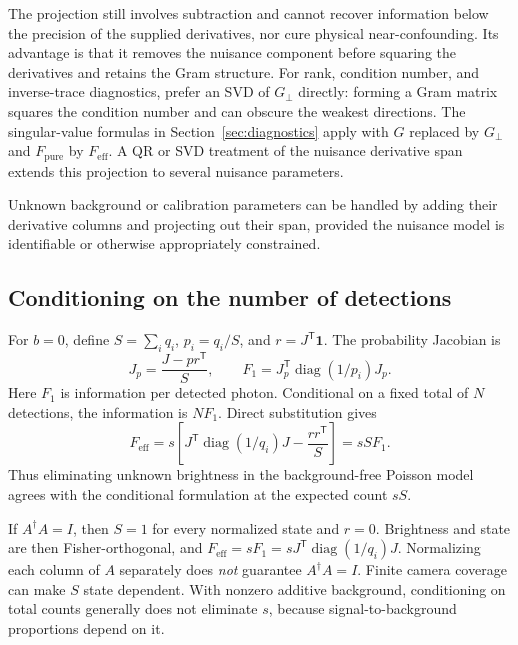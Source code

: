\documentclass[11pt,a4paper]{article}
\newcommand{\diag}{\operatorname{diag}}
\begin{document}
The projection still involves subtraction and cannot recover information
below the precision of the supplied derivatives, nor cure physical
near-confounding. Its advantage is that it removes the nuisance component
before squaring the derivatives and retains the Gram structure. For rank,
condition number, and inverse-trace diagnostics, prefer an SVD of
$G_\perp$ directly: forming a Gram matrix squares the condition number and
can obscure the weakest directions. The singular-value formulas in
Section~\ref{sec:diagnostics} apply with $G$ replaced by $G_\perp$ and
$F_{\mathrm{pure}}$ by $F_{\mathrm{eff}}$. A QR or SVD treatment of the
nuisance derivative span extends this
projection to several nuisance parameters.

Unknown background or calibration parameters can be handled by adding
their derivative columns and projecting out their span, provided the
nuisance model is identifiable or otherwise appropriately constrained.

\subsection{Conditioning on the number of detections}
For $b=0$, define $S=\sum_iq_i$, $p_i=q_i/S$, and
$r=J^{\mathsf T}\mathbf 1$. The probability Jacobian is
\begin{equation}
 J_p=\frac{J-pr^{\mathsf T}}{S},\qquad
 F_1=J_p^{\mathsf T}\diag(1/p_i)J_p. \label{eq:conditional}
\end{equation}
Here $F_1$ is information per detected photon. Conditional on a fixed total
of $N$ detections, the information is $NF_1$. Direct substitution gives
\begin{equation}
 F_{\mathrm{eff}}=s\left[J^{\mathsf T}\diag(1/q_i)J
 -\frac{rr^{\mathsf T}}{S}\right]=sS F_1.
\end{equation}
Thus eliminating unknown brightness in the background-free Poisson model
agrees with the conditional formulation at the expected count $sS$.

If $A^\dagger A=I$, then $S=1$ for every normalized state and $r=0$.
Brightness and state are then Fisher-orthogonal, and
$F_{\mathrm{eff}}=sF_1=sJ^{\mathsf T}\diag(1/q_i)J$.
Normalizing each column of $A$ separately does \emph{not} guarantee
$A^\dagger A=I$. Finite camera coverage can make $S$ state dependent.
With nonzero additive background, conditioning on total counts generally
does not eliminate $s$, because signal-to-background proportions depend on it.
\end{document}
